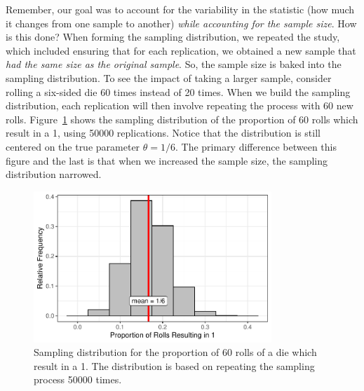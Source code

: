 \documentclass[
  letterpaper,
  DIV=11,
  numbers=noendperiod]{scrreprt}
\theoremstyle{definition}
\theoremstyle{definition}
\theoremstyle{plain}
\theoremstyle{remark}
\begin{document}
Remember, our goal was to account for the variability in the statistic
(how much it changes from one sample to another) \emph{while accounting
for the sample size}. How is this done? When forming the sampling
distribution, we repeated the study, which included ensuring that for
each replication, we obtained a new sample that \emph{had the same size
as the original sample}. So, the sample size is baked into the sampling
distribution. To see the impact of taking a larger sample, consider
rolling a six-sided die 60 times instead of 20 times. When we build the
sampling distribution, each replication will then involve repeating the
process with 60 new rolls.
Figure~\ref{fig-samplingdistns-dice-histogram2} shows the sampling
distribution of the proportion of 60 rolls which result in a 1, using
50000 replications. Notice that the distribution is still centered on
the true parameter \(\theta = 1/6\). The primary difference between this
figure and the last is that when we increased the sample size, the
sampling distribution narrowed.

\begin{figure}

{\centering \includegraphics[width=0.8\textwidth,height=\textheight]{./images/fig-samplingdistns-dice-histogram2-1.pdf}

}

\caption{\label{fig-samplingdistns-dice-histogram2}Sampling distribution
for the proportion of 60 rolls of a die which result in a 1. The
distribution is based on repeating the sampling process 50000 times.}

\end{figure}
\end{document}
